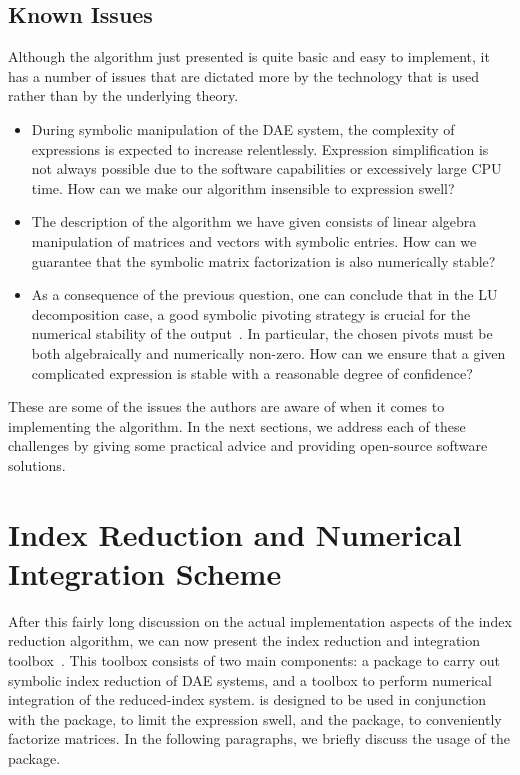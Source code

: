 \subsection{Known Issues}

Although the algorithm just presented is quite basic and easy to implement, it has a number of issues that are dictated more by the technology that is used rather than by the underlying theory.
%
\begin{itemize}
  \setlength{\itemsep}{0pt}
    \item During symbolic manipulation of the \ac{DAE} system, the complexity of expressions is expected to increase relentlessly. Expression simplification is not always possible due to the software capabilities or excessively large CPU time. How can we make our algorithm insensible to expression swell?
    \item The description of the algorithm we have given consists of linear algebra manipulation of matrices and vectors with symbolic entries. How can we guarantee that the symbolic matrix factorization is also numerically stable?
    \item As a consequence of the previous question, one can conclude that in the LU decomposition case, a good symbolic pivoting strategy is crucial for the numerical stability of the output~\cite{giesbrecht2014symbolic,zhou2007symbolic,zhou2005implicit}. In particular, the chosen pivots must be both algebraically and numerically non-zero. How can we ensure that a given complicated expression is stable with a reasonable degree of confidence?
\end{itemize}
%
These are some of the issues the authors are aware of when it comes to implementing the algorithm. In the next sections, we address each of these challenges by giving some practical advice and providing open-source software solutions.


\section{Index Reduction and Numerical Integration Scheme}
\label{chap6:sec:indigo}

After this fairly long discussion on the actual implementation aspects of the index reduction algorithm, we can now present the \Indigo{} index reduction and integration toolbox~\cite{indigo}. This toolbox consists of two main components: a \Maple{} package to carry out symbolic index reduction of \ac{DAE} systems, and a \Matlab{} toolbox to perform numerical integration of the reduced-index system. \Indigo{} is designed to be used in conjunction with the \LEM{} package, to limit the expression swell, and the \LAST{} package, to conveniently factorize matrices. In the following paragraphs, we briefly discuss the usage of the \Indigo{} package.

